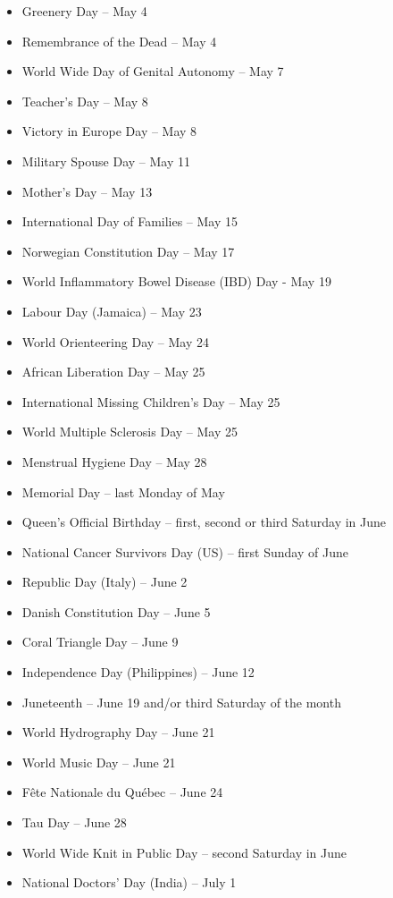 \documentclass[
  openany]{book}
\begin{document}
\begin{itemize}
\item
  Greenery Day -- May 4
\item
  Remembrance of the Dead -- May 4
\item
  World Wide Day of Genital Autonomy -- May 7
\item
  Teacher's Day -- May 8
\item
  Victory in Europe Day -- May 8
\item
  Military Spouse Day -- May 11
\item
  Mother's Day -- May 13
\item
  International Day of Families -- May 15
\item
  Norwegian Constitution Day -- May 17
\item
  World Inflammatory Bowel Disease (IBD) Day - May 19
\item
  Labour Day (Jamaica) -- May 23
\item
  World Orienteering Day -- May 24
\item
  African Liberation Day -- May 25
\item
  International Missing Children's Day -- May 25
\item
  World Multiple Sclerosis Day -- May 25
\item
  Menstrual Hygiene Day -- May 28
\item
  Memorial Day -- last Monday of May
\item
  Queen's Official Birthday -- first, second or third Saturday in June
\item
  National Cancer Survivors Day (US) -- first Sunday of June
\item
  Republic Day (Italy) -- June 2
\item
  Danish Constitution Day -- June 5
\item
  Coral Triangle Day -- June 9
\item
  Independence Day (Philippines) -- June 12
\item
  Juneteenth -- June 19 and/or third Saturday of the month
\item
  World Hydrography Day -- June 21
\item
  World Music Day -- June 21
\item
  Fête Nationale du Québec -- June 24
\item
  Tau Day -- June 28
\item
  World Wide Knit in Public Day -- second Saturday in June
\item
  National Doctors' Day (India) -- July 1

\end{itemize}
\end{document}
